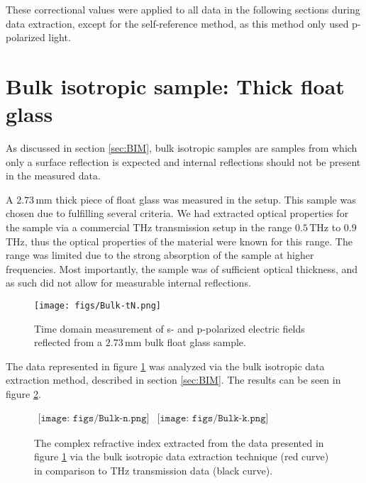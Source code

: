 These correctional values were applied to all data in the following sections during data extraction, except for the self-reference method, as this method only used p-polarized light.

\section{Bulk isotropic sample: Thick float glass}
\label{sec: Bulk_res}

As discussed in section \ref{sec:BIM}, bulk isotropic samples are samples from which only a surface reflection is expected and internal reflections should not be present in the measured data.

A $2.73\,$mm thick piece of float glass was measured in the setup. This sample was chosen due to fulfilling several criteria. We had extracted optical properties for the sample via a commercial THz transmission setup in the range $0.5\,$THz to $0.9\,$THz, thus the optical properties of the material were known for this range.  The range was limited due to the strong absorption of the sample at higher frequencies. Most importantly, the sample was of sufficient optical thickness, and as such did not allow for measurable internal reflections.

\begin{figure}[H]
\begin{center}
\texttt{[image: figs/Bulk-tN.png]}
\end{center}
\caption[Time-domain measurement: Bulk Glass, focused on pulse]{\label{fig:GlassBulkE0t} Time domain measurement of s- and p-polarized electric fields reflected from a $2.73\,$mm bulk float glass sample.}
\end{figure}

The data represented in figure \ref{fig:GlassBulkE0t} was analyzed via the bulk isotropic data extraction method, described in section \ref{sec:BIM}. The results can be seen in figure \ref{fig:BulkGlassExt}.


\begin{figure}[H]
                \begin{center}$
								\begin{array}{cc}
                \texttt{[image: figs/Bulk-n.png]}&
                \texttt{[image: figs/Bulk-k.png]}
								\end{array}$
								\end{center}
	\caption[Extract complex refractive index of bulk glass sample]{The complex refractive index extracted from the data presented in figure \ref{fig:GlassBulkE0t} via the bulk isotropic data extraction technique (red curve) in comparison to THz transmission data (black curve).}
	\label{fig:BulkGlassExt}
\end{figure}

